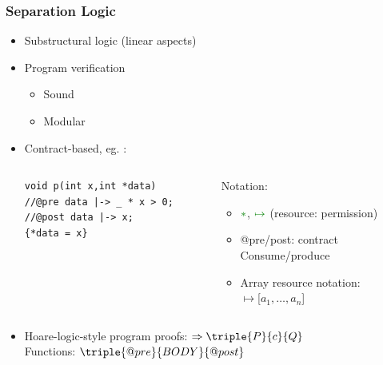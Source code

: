 \documentclass{beamer}
\begin{document}
\begin{frame}[fragile]
\frametitle{Separation Logic} 
\begin{itemize}
\item Substructural logic (linear aspects)
\item Program verification
\begin{itemize}
\item Sound %
\item Modular %
\end{itemize}
\item Contract-based, eg. :\\
\begin{columns}%
\begin{column}{0.55\textwidth}
\begin{lstlisting}[style=CStylenoNum, captionpos = t, xleftmargin = 4em]
void p(int x,int *data)
//@pre data |-> _ * x > 0;
//@post data |-> x;
{*data = x}
\end{lstlisting}
\end{column}
\begin{column}{0.45\textwidth}
Notation:
\begin{itemize}
\item $\textcolor{mGreen}{\ast}$, $\textcolor{mGreen}{\mapsto}$ (resource: permission)
\item @pre/post: contract\\
	\quad Consume/produce
\item Array resource notation:\\
	 \quad $\mapsto$[$a_1,\ldots, a_n$]
\end{itemize}
\end{column}
\end{columns}
\vspace{1em}
\item Hoare-logic-style program proofs: $\Rightarrow \triple{P}{c}{Q}$\\
	\quad Functions: $\triple{@pre}{BODY}{@post}$
\end{itemize}
\end{frame}

\end{document}
